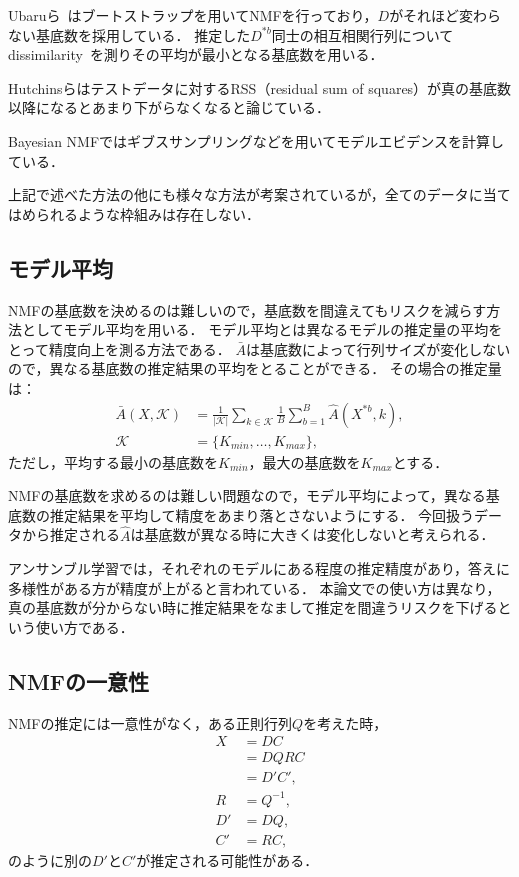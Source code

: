 Ubaruら~\cite{Ubaru2017}はブートストラップを用いてNMFを行っており，$D$がそれほど変わらない基底数を採用している．
推定した$D^{*b}$同士の相互相関行列についてdissimilarity~\cite{Wu}を測りその平均が最小となる基底数を用いる．

Hutchinsらはテストデータに対するRSS（residual sum of squares）が真の基底数以降になるとあまり下がらなくなると論じている\cite{Hutchins2008}．

Bayesian NMFではギブスサンプリングなどを用いてモデルエビデンスを計算している\cite{Cemgil2009}．

上記で述べた方法の他にも様々な方法が考案されているが，全てのデータに当てはめられるような枠組みは存在しない．

\subsection{モデル平均}
NMFの基底数を決めるのは難しいので，基底数を間違えてもリスクを減らす方法としてモデル平均を用いる．
モデル平均とは異なるモデルの推定量の平均をとって精度向上を測る方法である．
$\bar{A}$は基底数によって行列サイズが変化しないので，異なる基底数の推定結果の平均をとることができる．
その場合の推定量は：
\begin{align}
	\bar{A}(X,\mathcal{K}) &= \frac{1}{|\mathcal{K}|} \sum_{k \in \mathcal{K}} \frac{1}{B} \sum_{b=1}^B \hat{A}(X^{*b}, k),\\
	\mathcal{K} &= \{K_{min}, \dots, K_{max}\},
\end{align}
ただし，平均する最小の基底数を$K_{min}$，最大の基底数を$K_{max}$とする．

NMFの基底数を求めるのは難しい問題なので，モデル平均によって，異なる基底数の推定結果を平均して精度をあまり落とさないようにする．
今回扱うデータから推定される$\hat{A}$は基底数が異なる時に大きくは変化しないと考えられる．

アンサンブル学習では，それぞれのモデルにある程度の推定精度があり\cite{Kittler1998}，答えに多様性がある方が精度が上がる\cite{Kuncheva2006}と言われている．
本論文での使い方は異なり，真の基底数が分からない時に推定結果をなまして推定を間違うリスクを下げるという使い方である．

\subsection{NMFの一意性}
NMFの推定には一意性がなく，ある正則行列$Q$を考えた時，
\begin{align}
	X &= DC \\
	&= D Q R C \label{eq:dqrc} \\
	&= D'C', \\
	R &= Q^{-1}, \\
	D' &= DQ, \\
	C' &= RC,
\end{align}
のように別の$D'$と$C'$が推定される可能性がある．

